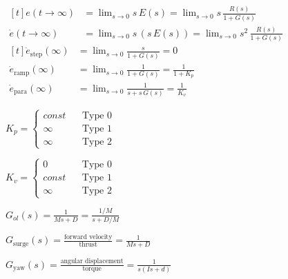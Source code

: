 \documentclass[multi={mymath,myarray},border=1pt]{standalone}
\newenvironment{mymath}{$\displaystyle}{$}
\newenvironment{myarray}{$\begin{aligned}[t]}{\end{aligned}$}
\begin{document}
\begin{myarray}
  e(t \rightarrow \infty) & = \lim_{s \rightarrow 0} s \, E(s) =
  \lim_{s \rightarrow 0} s \, \frac{R(s)}{1 + G(s)} \\
  \dot{e}(t \rightarrow \infty) & = \lim_{s \rightarrow 0} s \,(s \, E(s)) =
  \lim_{s \rightarrow 0} s^2 \, \frac{R(s)}{1 + G(s)} 
\end{myarray}
\begin{myarray}
  \dot{e}_{\text{step}}(\infty) & =  \lim_{s \rightarrow 0}  \frac{s}{1 + G(s)} =
  0 \\
  \dot{e}_{\text{ramp}}(\infty) & =  \lim_{s \rightarrow 0}  \frac{1}{1 + G(s)} =
  \frac{1}{1 + K_p}\\
  \dot{e}_{\text{para}}(\infty) & =  \lim_{s \rightarrow 0}  \frac{1}{s + s\,G(s)} =
  \frac{1}{K_v}
\end{myarray}

\begin{mymath}
  K_p = \left\{
  \begin{matrix}
    const & \:\:\:\:  \text{Type 0} \\
    \infty & \:\:\:\: \text{Type 1} \\
    \infty & \:\:\:\:  \text{Type 2}
  \end{matrix}
  \right.
\end{mymath}


\begin{mymath}
  K_v = \left\{
  \begin{matrix}
    0 & \:\:\:\:  \text{Type 0} \\
    const & \:\:\:\: \text{Type 1} \\
    \infty & \:\:\:\:  \text{Type 2}
  \end{matrix}
  \right.
\end{mymath}

\begin{mymath}
  G_{ol}(s) = \frac{1}{Ms +D} =\frac{1/M}{s+D/M}
\end{mymath}

\begin{mymath}
  G_{\text{surge}}(s) = \frac{\text{forward velocity}}{\text{thrust}} =
  \frac{1}{Ms + D} 
\end{mymath}

\begin{mymath}
  G_{\text{yaw}}(s) = \frac{\text{angular displacement}}{\text{torque}} =
  \frac{1}{s(Is + d)} 
\end{mymath}
\end{document}
